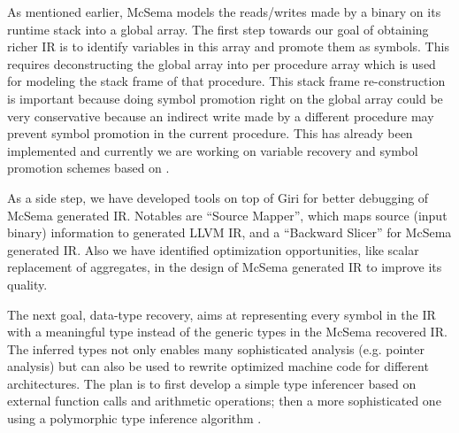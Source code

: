 \documentclass[10pt,twoside]{article}
\begin{document}
As mentioned earlier,  McSema models the reads/writes made by a binary on its
runtime stack into a global array.  The first step towards our goal of
obtaining richer IR is to identify variables in this array and promote them as
symbols. This requires deconstructing the global array into per
procedure array which is used for modeling the stack frame of that procedure.  This stack
frame re-construction is important because doing symbol promotion right on the
global array could be very conservative because an indirect write made by a
different procedure may prevent symbol promotion in the current procedure.
This has already been implemented and currently we are working on 
variable recovery and symbol promotion schemes based on
\cite{SECONDWRITE-EUROSYS-2013, DIVINE-VMCAI-2007}.

As a side step, we have developed tools \cite{SourceMapper} on top of
Giri\cite{GIRI-ASPLOS-2013} for better debugging of McSema generated IR.
Notables are ``Source Mapper'', which maps source (input binary) information
to generated LLVM IR, and a ``Backward Slicer'' for McSema generated IR. Also we
have identified optimization opportunities, like scalar replacement of
aggregates, in the design of McSema generated IR to improve its quality. 

The next goal, data-type recovery, aims at representing every symbol in the IR
with a meaningful type instead of the generic types in the McSema recovered IR.
The inferred types not only enables many sophisticated analysis (e.g. pointer
analysis) but can also be used to rewrite optimized machine code for different
architectures.  The plan is to first develop a simple type inferencer based on
external function calls and arithmetic operations; then a more sophisticated
one using a polymorphic type inference algorithm
\cite{POLYTYPEINFERENCE-PLDI-2016}.

\nocite{*}

\end{document}
